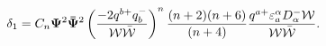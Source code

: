\begin{equation}\label{gen_rest2}
\delta_{1}=C_{n}{\bf \Psi}^{2}{\bf \bar\Psi}^{2}\left({-2q^{b
+}q^{-}_{b}\over {\cal W}\bar{\cal
W}}\right)^{n}{(n+2)(n+6)\over(n+4)}{q^{a
+}\varepsilon^{\alpha}_{a}D^{-}_{\alpha}{\cal W}\over{\cal W}
\bar{\cal W}}.
\end{equation}

